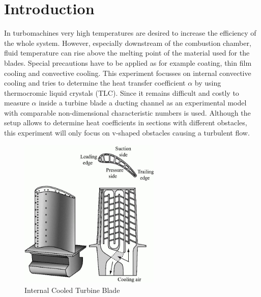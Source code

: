 \chapter{Introduction}\label{sec:introduction}

In turbomachines very high temperatures are desired to increase the efficiency of the whole system. However, especially downstream of the combustion chamber, fluid temperature can rise above the melting point of the material used for the blades. Special precautions have to be applied as for example coating, thin film cooling and convective cooling. This experiment focusses on internal convective cooling and tries to determine the heat transfer coefficient $\alpha$ by using thermocromic liquid crystals (TLC). Since it remains difficult and costly to measure $\alpha$ inside a turbine blade a ducting channel as an experimental model with comparable non-dimensional characteristic numbers is used. Although the setup allows to determine heat coefficients in sections with different obstacles, this experiment will only focus on v-shaped obstacles causing a turbulent flow.
\begin{figure}[H]
\begin{center}
\includegraphics[width=0.6\textwidth]{pics/blade3}
\caption{Internal Cooled Turbine Blade}
\label{pic:blade3}
\end{center}
\end{figure}
